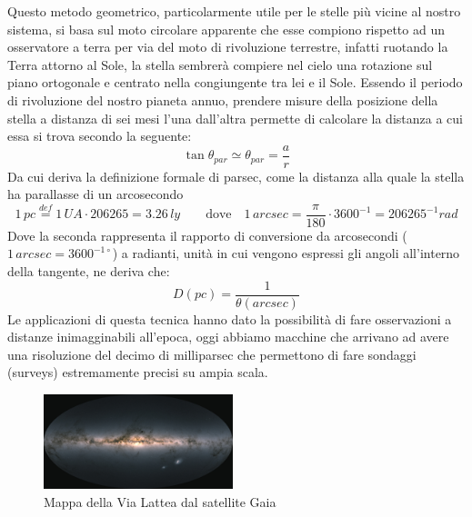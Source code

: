 \documentclass[a4paper,twoside,openany,notitlepage]{book}
\newcommand{\Def}{\overset{\mathit{def}}{=}}
\theoremstyle{definition}
\theoremstyle{plain}
\begin{document}
Questo metodo geometrico, particolarmente utile per le stelle più vicine al nostro sistema, si basa sul moto circolare apparente che esse compiono rispetto ad un osservatore a terra per via del moto di rivoluzione terrestre, infatti ruotando la Terra attorno al Sole, la stella sembrerà compiere nel cielo una rotazione sul piano ortogonale e centrato nella congiungente tra lei e il Sole. Essendo il periodo di rivoluzione del nostro pianeta annuo, prendere misure della posizione della stella a distanza di sei mesi l'una dall'altra permette di calcolare la distanza a cui essa si trova secondo la seguente:
\begin{equation}
	\label{def:parallasse}
	\tan\theta_{par} \simeq \theta_{par} = \frac{a}{r}
\end{equation}
Da cui deriva la definizione formale di parsec, come la distanza alla quale la stella ha parallasse di un arcosecondo
\begin{equation*}
	1\,pc \Def 1\,UA \cdot 206265 = 3.26\,ly \qquad \text{dove} \quad
	1\,arcsec = \frac{\pi}{180} \cdot 3600^{-1} = 206265^{-1} rad
\end{equation*}
Dove la seconda rappresenta il rapporto di conversione da arcosecondi ($1\,arcsec=3600^{-1 \circ}$) a radianti, unità in cui vengono espressi gli angoli all'interno della tangente, ne deriva che:
\begin{equation*}
	D(pc) = \frac{1}{\theta(arcsec)}
\end{equation*}
Le applicazioni di questa tecnica hanno dato la possibilità di fare osservazioni a distanze inimagginabili all'epoca, oggi abbiamo macchine che arrivano ad avere una risoluzione del decimo di milliparsec che permettono di fare sondaggi (surveys) estremamente precisi su ampia scala.

\begin{figure}
	\vspace{-5pt}
	\centering
	\includegraphics[width=0.49\textwidth]{./Immagini/Capitolo1/Via_Lattea_Gaia.jpg}
	\caption*{Mappa della Via Lattea dal satellite Gaia}
	\vspace{-10pt}
\end{figure}
\end{document}
